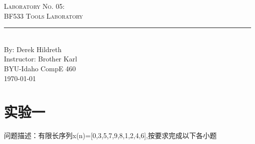 \documentclass[aps,letterpaper,10pt]{revtex4}
\newcommand{\labno}{05}
\newcommand{\labtitle}{BF533 Tools Laboratory}
\newcommand{\authorname}{Derek Hildreth}
\newcommand{\professor}{Brother Karl}
\newcommand{\classno}{CompE 460}
\begin{document}
\begin{CJK}{UTF8}{gkai}

\begin{titlepage}
\begin{center}
{\LARGE \textsc{Laboratory No. \labno:} \\ \vspace{4pt}}
{\Large \textsc{\labtitle} \\ \vspace{4pt}}
\rule[13pt]{\textwidth}{1pt} \\ \vspace{150pt}
{\large By: \authorname \\ \vspace{10pt}
Instructor: \professor \\ \vspace{10pt}
BYU-Idaho \classno \\ \vspace{10pt}
\today}
\end{center}
\end{titlepage}

\section{实验一}
问题描述：有限长序列x(n)=[0,3,5,7,9,8,1,2,4,6],按要求完成以下各小题

\end{CJK}
\end{document}
